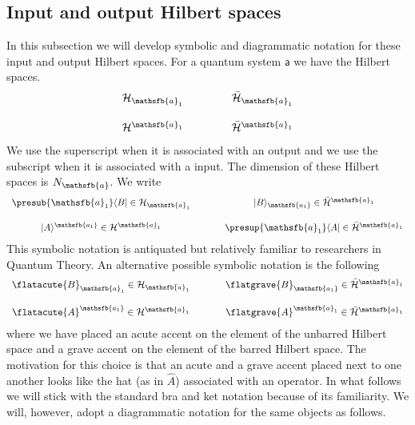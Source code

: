 \documentclass[10pt]{article}
\begin{document}
\subsection{Input and output Hilbert spaces}\label{sec:inputandoutputhilbertspaces}

In this subsection we will develop symbolic and diagrammatic notation for these input and output Hilbert spaces. For a quantum system $\mathsf{a}$ we have the Hilbert spaces.
\begin{equation}
\begin{array}{ll}
  \mathcal{H}_{\mathsfb{a}_1} ~~~~~ & ~~~~~\bar{\mathcal{H}}_{\mathsfb{a}_1} \\[5mm]
  \mathcal{H}^{\mathsfb{a}_1} ~~~~~& ~~~~~\bar{\mathcal{H}}^{\mathsfb{a}_1}
\end{array}
\end{equation}
We use the superscript when it is associated with an output and we use the subscript when it is associated with a input.  The dimension of these Hilbert spaces is $N_\mathsfb{a}$.   We write
\begin{equation}
\begin{array}{cc}
  \presub{\mathsfb{a}_1}\langle B|\in \mathcal{H}_{\mathsfb{a}_1} ~~~~ & ~~~~ |B\rangle_{\mathsfb{a_1}} \in \bar{\mathcal{H}}^{\mathsfb{a}_1} \\[5mm]
  |A\rangle^{\mathsfb{a_1}} \in \mathcal{H}^{\mathsfb{a}_1} ~~~~ & ~~~~ \presup{\mathsfb{a}_1}\langle A|\in \bar{\mathcal{H}}^{\mathsfb{a}_1}
\end{array}
\end{equation}
This symbolic notation is antiquated but relatively familiar to researchers in Quantum Theory.  An alternative possible symbolic notation is the following
\begin{equation}
\begin{array}{cc}
  \flatacute{B}_{\mathsfb{a}_1} \in \mathcal{H}_{\mathsfb{a}_1} ~~~~ & ~~~~ \flatgrave{B}_{\mathsfb{a_1}} \in \bar{\mathcal{H}}^{\mathsfb{a}_1} \\[5mm]
  \flatacute{A}^{\mathsfb{a_1}} \in \mathcal{H}^{\mathsfb{a}_1} ~~~~ & ~~~~ \flatgrave{A}^{\mathsfb{a}_1} \in \bar{\mathcal{H}}^{\mathsfb{a}_1}
\end{array}
\end{equation}
where we have placed an acute accent on the element of the unbarred Hilbert space and a grave accent on the element of the barred Hilbert space.  The motivation for this choice is that an acute and a grave accent placed next to one another looks like the hat (as in $\hat{A}$) associated with an operator.  In what follows we will stick with the standard bra and ket notation because of its familiarity.   We will, however, adopt a diagrammatic notation for the same objects as follows.
\end{document}
